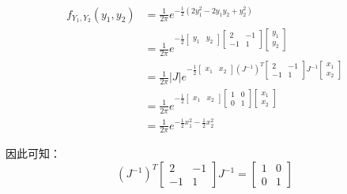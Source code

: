 \documentclass[a4paper,12pt]{ctexart}
\begin{document}
\begin{align*}
    f_{Y_1,Y_2}(y_1,y_2) &= \frac{1}{2\pi} e^{-\frac{1}{2}(2y_1^2-2y_1y_2+y_2^2)} \\
    &= \frac{1}{2\pi} e^{-\frac{1}{2} 
    \begin{bmatrix}
        y_1 & y_2
    \end{bmatrix}
    \begin{bmatrix}
        2 & -1 \\
        -1 & 1
    \end{bmatrix}
    \begin{bmatrix}
        y_1 \\
        y_2
    \end{bmatrix}
    } \\
    &= \frac{1}{2\pi} |J| e^{-\frac{1}{2} 
    \begin{bmatrix}
        x_1 & x_2
    \end{bmatrix}
    (J^{-1})^T
    \begin{bmatrix}
        2 & -1 \\
        -1 & 1
    \end{bmatrix}
    J^{-1}
    \begin{bmatrix}
        x_1 \\
        x_2
    \end{bmatrix}
    } \\
    &= \frac{1}{2\pi} e^{-\frac{1}{2} 
    \begin{bmatrix}
        x_1 & x_2
    \end{bmatrix}
    \begin{bmatrix}
        1 & 0 \\
        0 & 1
    \end{bmatrix}
    \begin{bmatrix}
        x_1 \\
        x_2
    \end{bmatrix}
    } \\
    &= \frac{1}{2\pi} e^{-\frac{1}{2}x_1^2-\frac{1}{2}x_2^2}
\end{align*}

因此可知：
\begin{equation*}
    (J^{-1})^T 
    \begin{bmatrix}
        2 & -1 \\
        -1 & 1
    \end{bmatrix}
    J^{-1}
    =
    \begin{bmatrix}
        1 & 0 \\
        0 & 1
    \end{bmatrix}
\end{equation*}
\end{document}
